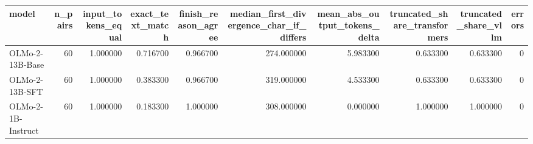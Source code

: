 \begin{tabular}{lrrrrrrrrr}
\toprule
model & n_pairs & input_tokens_equal & exact_text_match & finish_reason_agree & median_first_divergence_char_if_differs & mean_abs_output_tokens_delta & truncated_share_transformers & truncated_share_vllm & errors \\
\midrule
OLMo-2-13B-Base & 60 & 1.000000 & 0.716700 & 0.966700 & 274.000000 & 5.983300 & 0.633300 & 0.633300 & 0 \\
OLMo-2-13B-SFT & 60 & 1.000000 & 0.383300 & 0.966700 & 319.000000 & 4.533300 & 0.633300 & 0.633300 & 0 \\
OLMo-2-1B-Instruct & 60 & 1.000000 & 0.183300 & 1.000000 & 308.000000 & 0.000000 & 1.000000 & 1.000000 & 0 \\
\bottomrule
\end{tabular}

